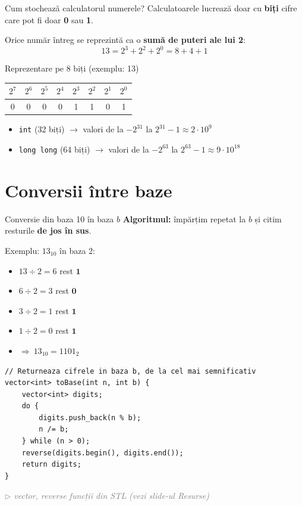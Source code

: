 ﻿\documentclass{beamer}
\newcommand{\beginnote}[1]{%
  \vfill
  {\footnotesize\textcolor{gray}{\textit{$\triangleright$ #1 (vezi slide-ul \emph{Resurse})}}}%
}
\begin{document}
\begin{frame}[fragile]{Cum stochează calculatorul numerele?}
  Calculatoarele lucrează doar cu \textbf{biți} \textemdash{} cifre care pot fi doar \textbf{0} sau \textbf{1}.
  \bigskip

  Orice număr întreg se reprezintă ca o \textbf{sumă de puteri ale lui 2}:
  \[
    13 = 2^3 + 2^2 + 2^0 = 8 + 4 + 1
  \]

  \begin{block}{Reprezentare pe 8 biți (exemplu: 13)}
    \begin{center}
    \begin{tabular}{|c|c|c|c|c|c|c|c|}
      \hline
      $2^7$ & $2^6$ & $2^5$ & $2^4$ & $2^3$ & $2^2$ & $2^1$ & $2^0$ \\
      \hline
      0 & 0 & 0 & 0 & 1 & 1 & 0 & 1 \\
      \hline
    \end{tabular}
    \end{center}
  \end{block}
  \medskip
  \begin{itemize}
    \item \lstinline|int| (32 biți) $\rightarrow$ valori de la $-2^{31}$ la $2^{31}-1 \approx 2 \cdot 10^9$
    \item \lstinline|long long| (64 biți) $\rightarrow$ valori de la $-2^{63}$ la $2^{63}-1 \approx 9 \cdot 10^{18}$
  \end{itemize}
\end{frame}

\section{Conversii între baze}

\begin{frame}{Conversie din baza 10 în baza $b$}
  \textbf{Algoritmul:} împărțim repetat la $b$ și citim resturile \textbf{de jos în sus}.
  \medskip

  Exemplu: $13_{10}$ în baza 2:
  \begin{itemize}
    \item $13 \div 2 = 6$ rest $\mathbf{1}$
    \item $6 \div 2 = 3$ rest $\mathbf{0}$
    \item $3 \div 2 = 1$ rest $\mathbf{1}$
    \item $1 \div 2 = 0$ rest $\mathbf{1}$
    \item $\Rightarrow\ 13_{10} = 1101_2$
  \end{itemize}
  \begin{center}
  \begin{lstlisting}
// Returneaza cifrele in baza b, de la cel mai semnificativ
vector<int> toBase(int n, int b) {
    vector<int> digits;
    do {
        digits.push_back(n % b);
        n /= b;
    } while (n > 0);
    reverse(digits.begin(), digits.end());
    return digits;
}
  \end{lstlisting}
  \end{center}
  \beginnote{vector, reverse \textemdash{} funcții din STL}
\end{frame}
\end{document}

